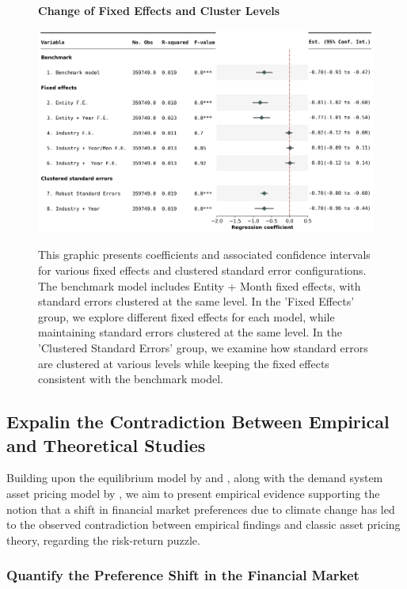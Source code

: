 \documentclass[12pt]{article}
\begin{document}
\begin{figure}[H]
\centering
\caption{\textbf{Change of Fixed Effects and Cluster Levels}}
\includegraphics[width=.8\textwidth]{graphics/forestplot.png}
\label{fig: forestplot}
\caption*{\footnotesize{This graphic presents coefficients and associated confidence intervals for various fixed effects and clustered standard error configurations. The benchmark model includes Entity + Month fixed effects, with standard errors clustered at the same level. In the 'Fixed Effects' group, we explore different fixed effects for each model, while maintaining standard errors clustered at the same level. In the 'Clustered Standard Errors' group, we examine how standard errors are clustered at various levels while keeping the fixed effects consistent with the benchmark model.}}
\end{figure}

\subsection{Expalin the Contradiction Between Empirical and Theoretical Studies}
\label{sec: result4}

Building upon the equilibrium model by \citet{pastor2021sustainable} and \citet{pedersen2021responsible}, along with the demand system asset pricing model by \citet{koijen2019demand}, we aim to present empirical evidence supporting the notion that a shift in financial market preferences due to climate change has led to the observed contradiction between empirical findings and classic asset pricing theory, regarding the risk-return puzzle.

\subsubsection{Quantify the Preference Shift in the Financial Market}
\end{document}

